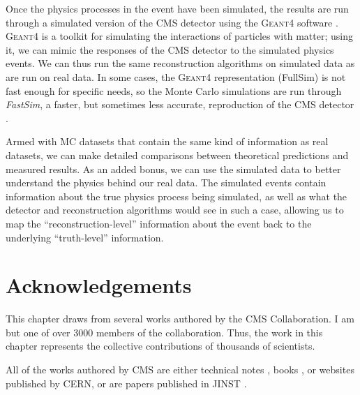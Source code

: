 Once the physics processes in the event have been simulated, the
results are run through a simulated version of the CMS detector using
the \textsc{Geant4} software \cite{geant}. \textsc{Geant4} is a
toolkit for simulating the interactions of particles with matter;
using it, we can mimic the responses of the CMS detector to the
simulated physics events. We can thus run the same reconstruction
algorithms on simulated data as are run on real data. In some cases,
the \textsc{Geant4} representation (FullSim) is not fast enough
for specific needs, so the Monte Carlo simulations are run through
\emph{FastSim}, a faster, but sometimes less accurate, reproduction of
the CMS detector \cite{fastsim}.

Armed with MC datasets that contain the same kind of information as
real datasets, we can make detailed comparisons between theoretical
predictions and measured results. As an added bonus, we can use the
simulated data to better understand the physics behind our real
data. The simulated events contain information about the true physics
process being simulated, as well as what the detector and
reconstruction algorithms would see in such a case, allowing us to
map the ``reconstruction-level'' information about the event back to
the underlying ``truth-level'' information.

\section{Acknowledgements}
\label{sec:hardware:acknowledgements}

This chapter draws from several works authored by the CMS
Collaboration. I am but one of over 3000 members of the
collaboration. Thus, the work in this chapter represents the
collective contributions of thousands of scientists.

All of the works authored by CMS are either technical notes
\cite{pixeltdr,kalman1,kalman2}, books \cite{tdr,accelexper}, or
websites \cite{cernphotos,websitecms,websitedt,websitecsc,websiterpc}
published by CERN, or are papers published in JINST
\cite{lhc,cms,particleflow,trigger,btag1,btag2}.

